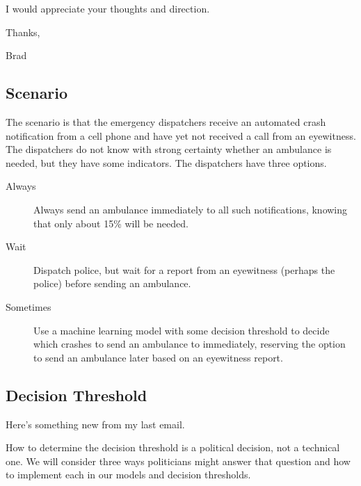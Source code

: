 I would appreciate your thoughts and direction.  

Thanks,

Brad

\subsection{Scenario}  

The scenario is that the emergency dispatchers receive an automated crash notification from a cell phone and have yet not received a call from an eyewitness.  The dispatchers do not know with strong certainty whether an ambulance is needed, but they have some indicators.  The dispatchers have three options.  

\begin{description}
	\item [Always] Always send an ambulance immediately to all such notifications, knowing that only about 15\% will be needed.
	\item [Wait] Dispatch police, but wait for a report from an eyewitness (perhaps the police) before sending an ambulance.
	\item [Sometimes] Use a machine learning model with some decision threshold to decide which crashes to send an ambulance to immediately, reserving the option to send an ambulance later based on an eyewitness report.  
\end{description}

\subsection{Decision Threshold}

Here's something new from my last email.  

How to determine the decision threshold is a political decision, not a technical one.  We will consider three ways politicians might answer that question and how to implement each in our models and decision thresholds.  

